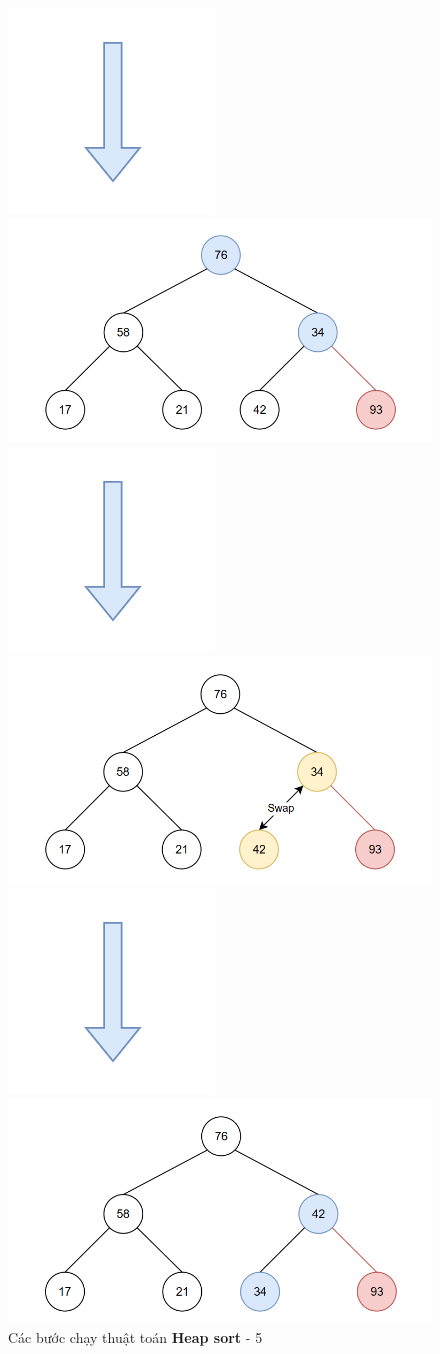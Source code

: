 \begin{figure}[H]
    \centering
    \includegraphics[width=0.1\linewidth]{img/heap_sort/arrow.png}
    \vspace{0.01cm}

    \includegraphics[width=0.5\linewidth]{img/heap_sort/10.png}
    \vspace{0.01cm}

    \includegraphics[width=0.1\linewidth]{img/heap_sort/arrow.png}
    \vspace{0.01cm}

    \includegraphics[width=0.5\linewidth]{img/heap_sort/11.png}
    \vspace{0.01cm}

    \includegraphics[width=0.1\linewidth]{img/heap_sort/arrow.png}
    \vspace{0.01cm}

    \includegraphics[width=0.5\linewidth]{img/heap_sort/12.png}

    \caption{Các bước chạy thuật toán \textbf{Heap sort} - 5}
\end{figure}

